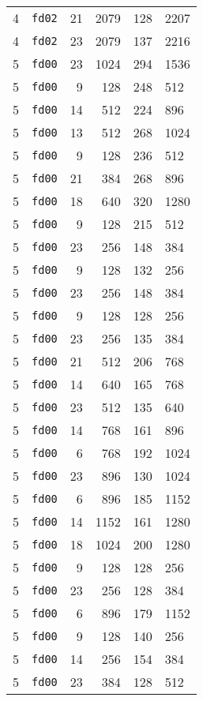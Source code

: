 \documentclass{article}
\begin{document}
\begin{table}[h!]
\begin{tabular}{llrrrl}
    4 & \texttt{fd02} & 21 & 2079 & 128 & 2207 \\
    4 & \texttt{fd02} & 23 & 2079 & 137 & 2216 \\
    5 & \texttt{fd00} & 23 & 1024 & 294 & 1536 \\
    5 & \texttt{fd00} & 9 & 128 & 248 & 512 \\
    5 & \texttt{fd00} & 14 & 512 & 224 & 896 \\
    5 & \texttt{fd00} & 13 & 512 & 268 & 1024 \\
    5 & \texttt{fd00} & 9 & 128 & 236 & 512 \\
    5 & \texttt{fd00} & 21 & 384 & 268 & 896 \\
    5 & \texttt{fd00} & 18 & 640 & 320 & 1280 \\
    5 & \texttt{fd00} & 9 & 128 & 215 & 512 \\
    5 & \texttt{fd00} & 23 & 256 & 148 & 384 \\
    5 & \texttt{fd00} & 9 & 128 & 132 & 256 \\
    5 & \texttt{fd00} & 23 & 256 & 148 & 384 \\
    5 & \texttt{fd00} & 9 & 128 & 128 & 256 \\
    5 & \texttt{fd00} & 23 & 256 & 135 & 384 \\
    5 & \texttt{fd00} & 21 & 512 & 206 & 768 \\
    5 & \texttt{fd00} & 14 & 640 & 165 & 768 \\
    5 & \texttt{fd00} & 23 & 512 & 135 & 640 \\
    5 & \texttt{fd00} & 14 & 768 & 161 & 896 \\
    5 & \texttt{fd00} & 6 & 768 & 192 & 1024 \\
    5 & \texttt{fd00} & 23 & 896 & 130 & 1024 \\
    5 & \texttt{fd00} & 6 & 896 & 185 & 1152 \\
    5 & \texttt{fd00} & 14 & 1152 & 161 & 1280 \\
    5 & \texttt{fd00} & 18 & 1024 & 200 & 1280 \\
    5 & \texttt{fd00} & 9 & 128 & 128 & 256 \\
    5 & \texttt{fd00} & 23 & 256 & 128 & 384 \\
    5 & \texttt{fd00} & 6 & 896 & 179 & 1152 \\
    5 & \texttt{fd00} & 9 & 128 & 140 & 256 \\
    5 & \texttt{fd00} & 14 & 256 & 154 & 384 \\
    5 & \texttt{fd00} & 23 & 384 & 128 & 512 \\

\end{tabular}
\end{table}
\end{document}
